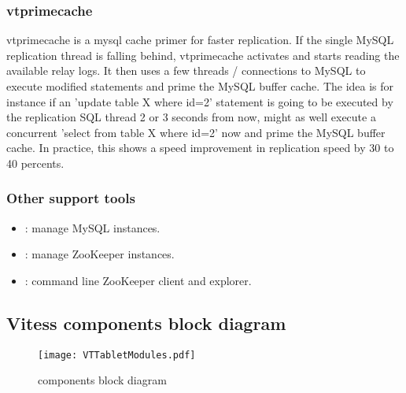 \subsubsection{vtprimecache}\hypertarget{vtprimecache}{}\label{vtprimecache}

 vtprimecache is a mysql cache primer for faster replication. If the single MySQL replication thread is falling behind, vtprimecache activates and starts reading the available relay logs. It then uses a few threads / connections to MySQL to execute modified statements and prime the MySQL buffer cache. The idea is for instance if an 'update table X where id=2' statement is going to be executed by the replication SQL thread 2 or 3 seconds from now, might as well execute a concurrent 'select from table X where id=2' now and prime the MySQL buffer cache. In practice, this shows a speed improvement in replication speed by 30 to 40 percents.

\subsubsection{Other support tools}\hypertarget{other-support-tools}{}\label{other-support-tools}

\begin{itemize}
\item {} : manage MySQL instances.
\item {} : manage ZooKeeper instances.
\item {}: command line ZooKeeper client and explorer.
\end{itemize}

\subsection{Vitess components block diagram}\hypertarget{vitess-components-block-diagram}{}\label{vitess-components-block-diagram}

\begin{figure}[H]
\caption{components block diagram}
\label{fig:Vitess Spectrum}
\begin{center}
\texttt{[image: VTTabletModules.pdf]}
\end{center}
\end{figure}





